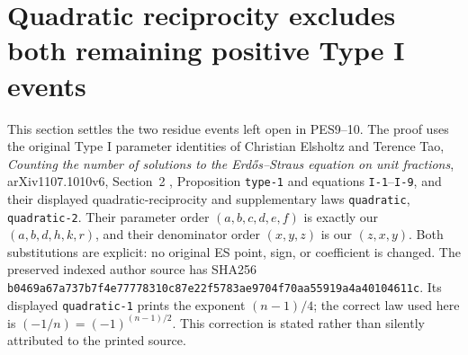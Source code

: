 \section{Quadratic reciprocity excludes both remaining positive Type I events}
This section settles the two residue events left open in PES9--10.
The proof uses the original Type I parameter identities of Christian
Elsholtz and Terence Tao, \emph{Counting the number of solutions to the
Erd\H{o}s--Straus equation on unit fractions}, arXiv1107.1010v6,
Section~2 \cite[Section~2]{ElsholtzTao2015},
Proposition \texttt{type-1} and equations \texttt{I-1}--\texttt{I-9},
and their displayed quadratic-reciprocity and supplementary laws
\texttt{quadratic}, \texttt{quadratic-2}. Their parameter order
$(a,b,c,d,e,f)$ is exactly our $(a,b,d,h,k,r)$, and their denominator
order $(x,y,z)$ is our $(z,x,y)$. Both substitutions are explicit:
no original ES point, sign, or coefficient is changed. The preserved
indexed author source has SHA256
\texttt{b0469a67a737b7f4e77778310c87e22f5783ae9704f70aa55919a4a40104611c}.
Its displayed \texttt{quadratic-1} prints the exponent $(n-1)/4$;
the correct law used here is $(-1/n)=(-1)^{(n-1)/2}$. This correction
is stated rather than silently attributed to the printed source.

